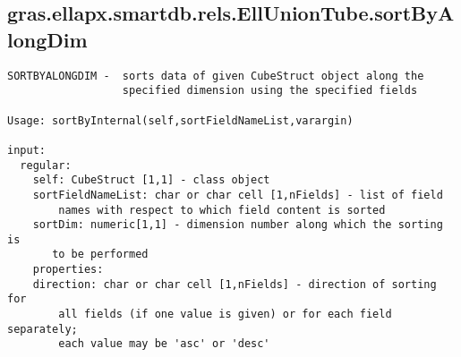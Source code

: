 \subsection{\texorpdfstring{gras.ellapx.smartdb.rels.EllUnionTube.sortByAlongDim}{sortByAlongDim}}\label{method:gras.ellapx.smartdb.rels.EllUnionTube.sortByAlongDim}
\begin{verbatim}
SORTBYALONGDIM -  sorts data of given CubeStruct object along the
                  specified dimension using the specified fields

Usage: sortByInternal(self,sortFieldNameList,varargin)

input:
  regular:
    self: CubeStruct [1,1] - class object
    sortFieldNameList: char or char cell [1,nFields] - list of field
        names with respect to which field content is sorted
    sortDim: numeric[1,1] - dimension number along which the sorting is
       to be performed
    properties:
    direction: char or char cell [1,nFields] - direction of sorting for
        all fields (if one value is given) or for each field separately;
        each value may be 'asc' or 'desc'
\end{verbatim}
